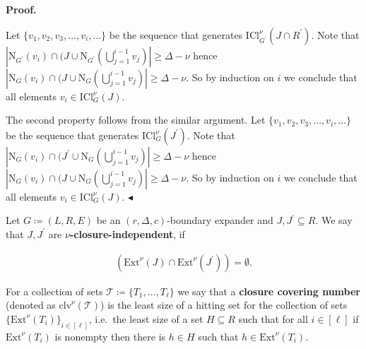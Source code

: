 \documentclass[10pt,a4paper]{article}
\begin{document}




\par\medskip\noindent\textbf{Proof.}\par




Let $\{v_{1},v_{2},v_{3},\dots,v_{i},\dots\}$ be the sequence that generates $\mathrm{ICl}_{G^{\prime}}^{\nu}\left(J\cap R^{\prime}\right)$. Note that $|\mathrm{N}_{G^{\prime}}\left(v_{i}\right)\cap(J\cup\mathrm{N}_{G^{\prime}}%
\left(\bigcup\limits_{j=1}^{i-1}v_{j}\right)|\geq\Delta-\nu$ hence $|\mathrm{N}_{G}\left(v_{i}\right)\cap(J\cup\mathrm{N}_{G}\left(\bigcup\limits_%
{j=1}^{i-1}v_{j}\right)|\geq\Delta-\nu$. So by induction on $i$ we conclude that all elements $v_{i}\in\mathrm{ICl}_{G}^{\nu}\left(J\right)$.\par




The second property follows from the similar argument. Let $\{v_{1},v_{2},v_{3},\dots,v_{i},\dots\}$ be
the sequence that generates $\mathrm{ICl}_{G}^{\nu}\left(J^{\prime}\right)$. Note that $|\mathrm{N}_{G}\left(v_{i}\right)\cap(J^{\prime}\cup\mathrm{N}_{G}\left(%
\bigcup\limits_{j=1}^{i-1}v_{j}\right)|\geq\Delta-\nu$ hence $|\mathrm{N}_{G}\left(v_{i}\right)\cap(J\cup\mathrm{N}_{G}\left(\bigcup\limits_%
{j=1}^{i-1}v_{j}\right)|\geq\Delta-\nu$. So by induction on $i$ we conclude
that all elements $v_{i}\in\mathrm{ICl}_{G}^{\nu}\left(J\right)$.
$\blacktriangleleft$\par




Let $G\coloneqq(L,R,E)$ be an $(r,\Delta,c)$-boundary expander and $J,J^{\prime}\subseteq R$. We say that
$J,J^{\prime}$ are $\nu$\textbf{-closure-independent}, if\par


\[\begin{gathered}
\left(\mathrm{Ext}^{\nu}\left(J\right)\cap\mathrm{Ext}^{\nu}\left(J^{\prime}%
\right)\right)=\emptyset.
\end{gathered}\]


For a collection of sets $\mathcal{T}\coloneqq\{T_{1},\dots,T_{\ell}\}$ we say that a
\textbf{closure covering number} (denoted as $\mathrm{clv}^{\nu}\left(\mathcal{T}\right)$) is the least size of a hitting
set for the collection of sets $\{\mathrm{Ext}^{\nu}\left(T_{i}\right)\}_{i\in[\ell]}$, i.e. the least size of a set $H\subseteq R$ such that for all $i\in[\ell]$ if $\mathrm{Ext}^{\nu}\left(T_{i}\right)$ is nonempty then there is $h\in H$
such that $h\in\mathrm{Ext}^{\nu}\left(T_{i}\right)$.\par
\end{document}
